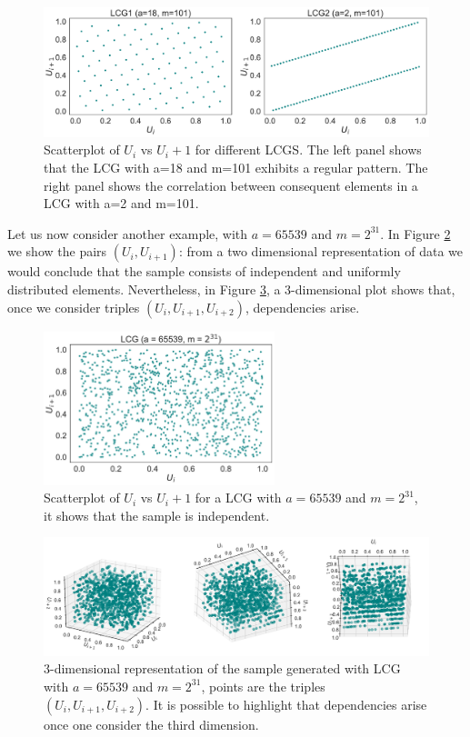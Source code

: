 \documentclass[twoside,onecolumn]{article}
\theoremstyle{definition}
\begin{document}
\begin{figure} \centering
         \includegraphics[width=\textwidth]{../results/lcg_params_study.pdf}
\caption{Scatterplot of $U_i$ vs $U_i+1$ for different LCGS. The left panel shows that the LCG with a=18 and m=101 exhibits a regular pattern. The right panel shows the correlation between consequent elements in a LCG with a=2 and m=101. }\label{fig:params}
\end{figure}
\par
Let us now consider another example, with  $a=65539$ and $m=2^{31}$. In Figure \ref{fig:unif_lcg} we show the pairs $(U_i, U_{i+1})$: from a two dimensional representation of data we would conclude that the sample consists of independent and uniformly distributed elements. Nevertheless, in Figure \ref{fig:3dlcg}, a 3-dimensional plot shows that, once we consider triples $(U_i, U_{i+1},U_{i+2})$, dependencies arise. 


\begin{figure} \centering
         \includegraphics[width=0.6\textwidth]{../results/lcg_uniform.pdf}
\caption{Scatterplot of $U_i$ vs $U_i+1$ for a LCG with $a=65539$ and $m=2^{31}$, it shows that the sample is independent. }\label{fig:unif_lcg}
\end{figure}


\begin{figure} \centering
         \includegraphics[width=\textwidth]{../results/lcg_3d.pdf}
\caption{3-dimensional representation of the sample generated with LCG with $a=65539$ and $m=2^{31}$, points are the triples $(U_i, U_{i+1},U_{i+2})$. It is possible to highlight that dependencies arise once one consider the third dimension. 
}\label{fig:3dlcg}
\end{figure}
\end{document}
